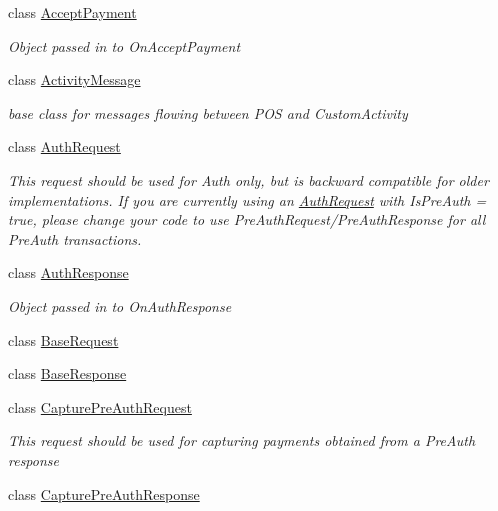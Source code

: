 \begin{DoxyCompactItemize}
\item 
class \hyperlink{classcom_1_1clover_1_1remotepay_1_1sdk_1_1_accept_payment}{Accept\+Payment}
\begin{DoxyCompactList}\small\item\em Object passed in to On\+Accept\+Payment \end{DoxyCompactList}\item 
class \hyperlink{classcom_1_1clover_1_1remotepay_1_1sdk_1_1_activity_message}{Activity\+Message}
\begin{DoxyCompactList}\small\item\em base class for messages flowing between P\+OS and Custom\+Activity \end{DoxyCompactList}\item 
class \hyperlink{classcom_1_1clover_1_1remotepay_1_1sdk_1_1_auth_request}{Auth\+Request}
\begin{DoxyCompactList}\small\item\em This request should be used for Auth only, but is backward compatible for older implementations. If you are currently using an \hyperlink{classcom_1_1clover_1_1remotepay_1_1sdk_1_1_auth_request}{Auth\+Request} with Is\+Pre\+Auth = true, please change your code to use Pre\+Auth\+Request/\+Pre\+Auth\+Response for all Pre\+Auth transactions. \end{DoxyCompactList}\item 
class \hyperlink{classcom_1_1clover_1_1remotepay_1_1sdk_1_1_auth_response}{Auth\+Response}
\begin{DoxyCompactList}\small\item\em Object passed in to On\+Auth\+Response \end{DoxyCompactList}\item 
class \hyperlink{classcom_1_1clover_1_1remotepay_1_1sdk_1_1_base_request}{Base\+Request}
\item 
class \hyperlink{classcom_1_1clover_1_1remotepay_1_1sdk_1_1_base_response}{Base\+Response}
\item 
class \hyperlink{classcom_1_1clover_1_1remotepay_1_1sdk_1_1_capture_pre_auth_request}{Capture\+Pre\+Auth\+Request}
\begin{DoxyCompactList}\small\item\em This request should be used for capturing payments obtained from a Pre\+Auth response \end{DoxyCompactList}\item 
class \hyperlink{classcom_1_1clover_1_1remotepay_1_1sdk_1_1_capture_pre_auth_response}{Capture\+Pre\+Auth\+Response}

\end{DoxyCompactItemize}
